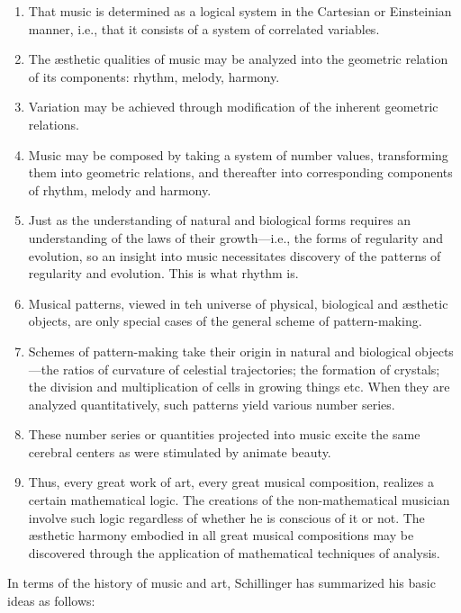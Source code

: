 \begin{enumerate}
	\item That music is determined as a logical system in the Cartesian or Einsteinian manner, i.e., that it consists of a system of correlated variables.
	\item The \ae sthetic qualities of music may be analyzed into the geometric relation of its components: rhythm, melody, harmony.
	\item Variation may be achieved through modification of the inherent geometric relations.
	\item Music may be composed by taking a system of number values, transforming them into geometric relations, and thereafter into corresponding components of rhythm, melody and harmony.
	\item Just as the understanding of natural and biological forms requires an understanding of the laws of their growth---i.e., the forms of regularity and evolution, so an insight into music necessitates discovery of the patterns of regularity and evolution. This is what rhythm is.
	\item Musical patterns, viewed in teh universe of physical, biological and \ae sthetic objects, are only special cases of the general scheme of pattern-making.
	\item Schemes of pattern-making take their origin in natural and biological objects---the ratios of curvature of celestial trajectories; the formation of crystals; the division and multiplication of cells in growing things etc. When they are analyzed quantitatively, such patterns yield various number series.
	\item These number series or quantities projected into music excite the same cerebral centers as were stimulated by animate beauty.
	\item Thus, every great work of art, every great musical composition, realizes a certain mathematical logic. The creations of the non-mathematical musician involve such logic regardless of whether he is conscious of it or not. The \ae sthetic harmony embodied in all great musical compositions may be discovered through the application of mathematical techniques of analysis.
\end{enumerate}

In terms of the history of music and art, Schillinger has summarized his basic ideas as follows:

